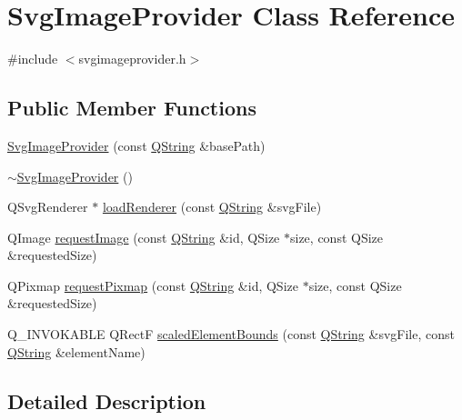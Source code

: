 \hypertarget{class_svg_image_provider}{\section{\-Svg\-Image\-Provider \-Class \-Reference}
\label{class_svg_image_provider}
}


{\ttfamily \#include $<$svgimageprovider.\-h$>$}

\subsection*{\-Public \-Member \-Functions}
\begin{DoxyCompactItemize}
\item 
\hyperlink{group___o_p_map_plugin_ga2b9c3d2098c51db2899a9d98684abb21}{\-Svg\-Image\-Provider} (const \hyperlink{group___u_a_v_objects_plugin_gab9d252f49c333c94a72f97ce3105a32d}{\-Q\-String} \&base\-Path)
\item 
\hyperlink{group___o_p_map_plugin_gadd8520789d1a874b7a4074bfafac4ea3}{$\sim$\-Svg\-Image\-Provider} ()
\item 
\-Q\-Svg\-Renderer $\ast$ \hyperlink{group___o_p_map_plugin_ga86ec36e3e8140373701546a7bbb0460b}{load\-Renderer} (const \hyperlink{group___u_a_v_objects_plugin_gab9d252f49c333c94a72f97ce3105a32d}{\-Q\-String} \&svg\-File)
\item 
\-Q\-Image \hyperlink{group___o_p_map_plugin_ga47800a9f6d3722318713988d27fde449}{request\-Image} (const \hyperlink{group___u_a_v_objects_plugin_gab9d252f49c333c94a72f97ce3105a32d}{\-Q\-String} \&id, \-Q\-Size $\ast$size, const \-Q\-Size \&requested\-Size)
\item 
\-Q\-Pixmap \hyperlink{group___o_p_map_plugin_ga8d12637852381c8b3d6682d4bed9e4c7}{request\-Pixmap} (const \hyperlink{group___u_a_v_objects_plugin_gab9d252f49c333c94a72f97ce3105a32d}{\-Q\-String} \&id, \-Q\-Size $\ast$size, const \-Q\-Size \&requested\-Size)
\item 
\-Q\-\_\-\-I\-N\-V\-O\-K\-A\-B\-L\-E \-Q\-Rect\-F \hyperlink{group___o_p_map_plugin_gaaa6ab880f473fb953480012d1c5b8a73}{scaled\-Element\-Bounds} (const \hyperlink{group___u_a_v_objects_plugin_gab9d252f49c333c94a72f97ce3105a32d}{\-Q\-String} \&svg\-File, const \hyperlink{group___u_a_v_objects_plugin_gab9d252f49c333c94a72f97ce3105a32d}{\-Q\-String} \&element\-Name)
\end{DoxyCompactItemize}


\subsection{\-Detailed \-Description}



